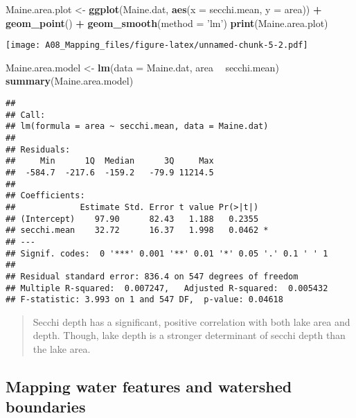 \documentclass[]{article}
\newenvironment{Shaded}{\begin{snugshade}}{\end{snugshade}}
\newcommand{\DataTypeTok}[1]{\textcolor[rgb]{0.13,0.29,0.53}{#1}}
\newcommand{\KeywordTok}[1]{\textcolor[rgb]{0.13,0.29,0.53}{\textbf{#1}}}
\newcommand{\NormalTok}[1]{#1}
\newcommand{\OperatorTok}[1]{\textcolor[rgb]{0.81,0.36,0.00}{\textbf{#1}}}
\newcommand{\StringTok}[1]{\textcolor[rgb]{0.31,0.60,0.02}{#1}}
\begin{document}
\begin{Shaded}
\begin{Highlighting}[]
\NormalTok{Maine.area.plot <-}\StringTok{ }\KeywordTok{ggplot}\NormalTok{(Maine.dat, }\KeywordTok{aes}\NormalTok{(}\DataTypeTok{x =}\NormalTok{ secchi.mean, }\DataTypeTok{y =}\NormalTok{ area)) }\OperatorTok{+}
\StringTok{  }\KeywordTok{geom_point}\NormalTok{() }\OperatorTok{+}
\StringTok{  }\KeywordTok{geom_smooth}\NormalTok{(}\DataTypeTok{method =} \StringTok{'lm'}\NormalTok{) }
\KeywordTok{print}\NormalTok{(Maine.area.plot)}
\end{Highlighting}
\end{Shaded}

\texttt{[image: A08\_Mapping\_files/figure-latex/unnamed-chunk-5-2.pdf]}

\begin{Shaded}
\begin{Highlighting}[]
\NormalTok{Maine.area.model <-}\StringTok{ }\KeywordTok{lm}\NormalTok{(}\DataTypeTok{data =}\NormalTok{ Maine.dat, area }\OperatorTok{~}\StringTok{ }\NormalTok{secchi.mean)}
\KeywordTok{summary}\NormalTok{(Maine.area.model)}
\end{Highlighting}
\end{Shaded}

\begin{verbatim}
## 
## Call:
## lm(formula = area ~ secchi.mean, data = Maine.dat)
## 
## Residuals:
##     Min      1Q  Median      3Q     Max 
##  -584.7  -217.6  -159.2   -79.9 11214.5 
## 
## Coefficients:
##             Estimate Std. Error t value Pr(>|t|)  
## (Intercept)    97.90      82.43   1.188   0.2355  
## secchi.mean    32.72      16.37   1.998   0.0462 *
## ---
## Signif. codes:  0 '***' 0.001 '**' 0.01 '*' 0.05 '.' 0.1 ' ' 1
## 
## Residual standard error: 836.4 on 547 degrees of freedom
## Multiple R-squared:  0.007247,   Adjusted R-squared:  0.005432 
## F-statistic: 3.993 on 1 and 547 DF,  p-value: 0.04618
\end{verbatim}

\begin{quote}
Secchi depth has a significant, positive correlation with both lake area
and depth. Though, lake depth is a stronger determinant of secchi depth
than the lake area.
\end{quote}

\hypertarget{mapping-water-features-and-watershed-boundaries}{%
\subsection{Mapping water features and watershed
boundaries}\label{mapping-water-features-and-watershed-boundaries}}
\end{document}
